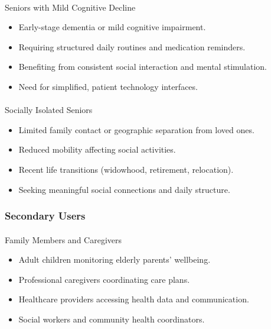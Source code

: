 \documentclass[
  letterpaper,
  DIV=11,
  numbers=noendperiod]{scrartcl}
\makeatletter
\let\oldparagraph\paragraph
\renewcommand{\paragraph}{
    \@ifstar
      \xxxParagraphStar
      \xxxParagraphNoStar
  }
\newcommand{\xxxParagraphStar}[1]{\oldparagraph*{#1}\mbox{}}
\newcommand{\xxxParagraphNoStar}[1]{\oldparagraph{#1}\mbox{}}
\providecommand{\tightlist}{%
  \setlength{\itemsep}{0pt}\setlength{\parskip}{0pt}}\usepackage{longtable,booktabs,array}
\makeatother
\begin{document}
\paragraph{Seniors with Mild Cognitive
Decline}\label{seniors-with-mild-cognitive-decline}

\begin{itemize}
\tightlist
\item
  Early-stage dementia or mild cognitive impairment.
\item
  Requiring structured daily routines and medication reminders.
\item
  Benefiting from consistent social interaction and mental stimulation.
\item
  Need for simplified, patient technology interfaces.
\end{itemize}

\paragraph{Socially Isolated Seniors}\label{socially-isolated-seniors}

\begin{itemize}
\tightlist
\item
  Limited family contact or geographic separation from loved ones.
\item
  Reduced mobility affecting social activities.
\item
  Recent life transitions (widowhood, retirement, relocation).
\item
  Seeking meaningful social connections and daily structure.
\end{itemize}

\subsubsection{Secondary Users}\label{secondary-users}

\paragraph{Family Members and
Caregivers}\label{family-members-and-caregivers}

\begin{itemize}
\tightlist
\item
  Adult children monitoring elderly parents' wellbeing.
\item
  Professional caregivers coordinating care plans.
\item
  Healthcare providers accessing health data and communication.
\item
  Social workers and community health coordinators.
\end{itemize}
\end{document}

